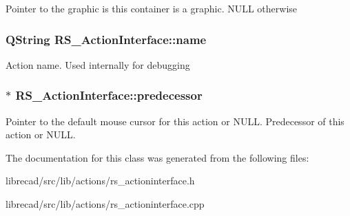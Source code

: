 Pointer to the graphic is this container is a graphic. N\-U\-L\-L otherwise \hypertarget{classRS__ActionInterface_a1fdccfa2fcee3e1d21e6f79e6987f3df}{
\subsubsection[{name}]{\setlength{\rightskip}{0pt plus 5cm}Q\-String R\-S\-\_\-\-Action\-Interface\-::name\hspace{0.3cm}{\ttfamily [protected]}}}\label{classRS__ActionInterface_a1fdccfa2fcee3e1d21e6f79e6987f3df}
Action name. Used internally for debugging \hypertarget{classRS__ActionInterface_af078a781a6180c761956d93e4d2bd4cb}{
\subsubsection[{predecessor}]{$\ast$ R\-S\-\_\-\-Action\-Interface\-::predecessor\hspace{0.3cm}{\ttfamily [protected]}}}\label{classRS__ActionInterface_af078a781a6180c761956d93e4d2bd4cb}
Pointer to the default mouse cursor for this action or N\-U\-L\-L. Predecessor of this action or N\-U\-L\-L. 

The documentation for this class was generated from the following files\-:\begin{DoxyCompactItemize}
\item 
librecad/src/lib/actions/rs\-\_\-actioninterface.\-h\item 
librecad/src/lib/actions/rs\-\_\-actioninterface.\-cpp\end{DoxyCompactItemize}
